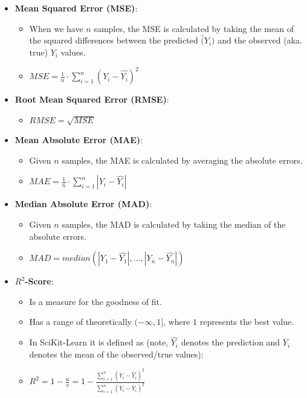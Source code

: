 \documentclass[12pt,a4paper]{article}
\begin{document}
\begin{itemize}
    \item \textbf{Mean Squared Error (MSE)}:
        \begin{itemize}
            \item When we have \(n\) samples, the MSE is calculated by taking the mean of the squared differences between the predicted \(\hat(Y_i)\) and the observed (aka. true) \(Y_i\) values.
            \item \(MSE = \frac{1}{n} \cdot \sum_{i = 1}^n (Y_i - \hat{Y_i})^2\)
        \end{itemize}
    \item \textbf{Root Mean Squared Error (RMSE)}:
        \begin{itemize}
            \item \(RMSE = \sqrt{MSE}\)
        \end{itemize}
    \item \textbf{Mean Absolute Error (MAE)}:
        \begin{itemize}
            \item Given \(n\) samples, the MAE is calculated by averaging the absolute errors.
            \item \(MAE = \frac{1}{n} \cdot \sum_{i = 1}^n |Y_i - \hat{Y_i}|\)
        \end{itemize}
    \item \textbf{Median Absolute Error (MAD)}:
        \begin{itemize}
            \item Given \(n\) samples, the MAD is calculated by taking the median of the absolute errors.
            \item \(MAD = median(|Y_1 - \hat{Y_1}|, ... , |Y_n - \hat{Y_n}|)\)
        \end{itemize}
    \item \textbf{\(R^2\)-Score}:
        \begin{itemize}
            \item Is a measure for the goodness of fit.
            \item Has a range of theoretically \((-\infty, 1]\), where \(1\) represents the best value.
            \item In SciKit-Learn it is defined as (note, \(\hat{Y_i}\) denotes the prediction and \(\overline{Y_i}\) denotes the mean of the observed/true values):
            \item \(R^2 = 1 - \frac{u}{v} = 1 - \frac{\sum_{i = 1}^n (Y_i - \hat{Y_i})^2}{\sum_{i = 1}^n (Y_i - \overline{Y_i})^2}\)
        \end{itemize}
\end{itemize}
\end{document}
